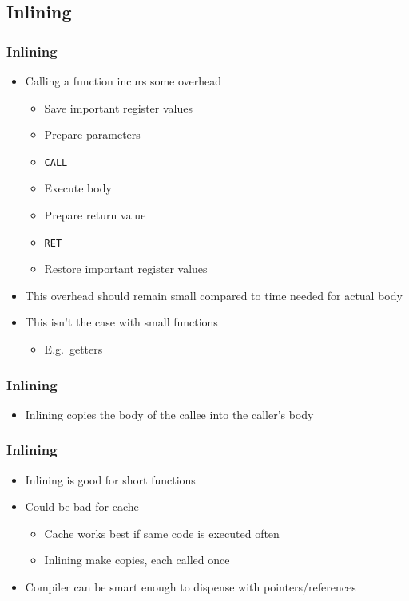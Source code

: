 \subsection{Inlining}

\frame{\tableofcontents[currentsubsection]}

\begin{frame}
  \frametitle{Inlining}
  \begin{itemize}
    \item Calling a function incurs some overhead
            \begin{itemize}
              \item Save important register values
              \item Prepare parameters
              \item \texttt{CALL}
              \item Execute body
              \item Prepare return value
              \item \texttt{RET}
              \item Restore important register values
            \end{itemize}
    \item This overhead should remain small compared to time needed for actual body
    \item This isn't the case with small functions
          \begin{itemize}
            \item E.g.~getters
          \end{itemize}
  \end{itemize}
\end{frame}

\begin{frame}
  \frametitle{Inlining}
  \begin{itemize}
    \item Inlining copies the body of the callee into the caller's body
  \end{itemize}
\end{frame}

\begin{frame}
  \frametitle{Inlining}
  \begin{itemize}
    \item Inlining is good for short functions
    \item Could be bad for cache
          \begin{itemize}
            \item Cache works best if same code is executed often
            \item Inlining make copies, each called once
          \end{itemize}
    \item Compiler can be smart enough to dispense with pointers/references
  \end{itemize}
\end{frame}

